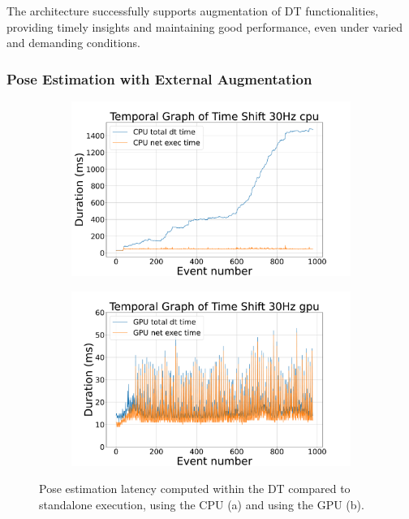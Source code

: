 The architecture successfully supports augmentation of DT functionalities, providing timely insights and maintaining good performance, even under varied and demanding conditions.


\subsubsection{Pose Estimation with External Augmentation}

\begin{figure}
    \centering
    \begin{subfigure}{0.49\textwidth}
    \centering
        \includegraphics[width=\textwidth]{figures/temporal_graph_time_shift_30hz_cpu.pdf}
        \subcaption{}
        \label{fig:af_time_shift_30hz_cpu}
    \end{subfigure}
    \hfill
    \begin{subfigure}{0.49\textwidth}
    \centering
        \includegraphics[width=\textwidth]{figures/temporal_graph_time_shift_30hz_gpu.pdf}
        \subcaption{}
        \label{fig:af_time_shift_30hz_gpu}
    \end{subfigure}
    \caption{Pose estimation latency computed within the DT compared to standalone execution, using the CPU (a) and using the GPU (b).}
    \label{fig:af_results}
\end{figure}


